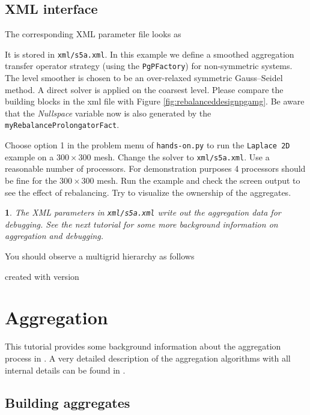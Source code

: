 \documentclass[10pt,fleqn]{book}
\newtheorem*{mycomment}{\ding{42}}
\newcommand\printScreenOutput[1]{

{\vspace{-0.3cm}\hfill\tiny{created with \muelu version }}
}
\begin{document}
\section{XML interface}
The corresponding XML parameter file looks as



It is stored in \texttt{xml/s5a.xml}. In this example we define a smoothed aggregation transfer operator strategy (using the \verb|PgPFactory|) for non-symmetric systems. The level smoother is chosen to be an over-relaxed symmetric Gauss--Seidel method. A direct solver is applied on the coarsest level. Please compare the building blocks in the xml file with Figure \ref{fig:rebalanceddesignpgamg}. Be aware that the \textit{Nullspace} variable now is also generated by the \texttt{myRebalanceProlongatorFact}.

\begin{exercise}
Choose option 1 in the problem menu of \verb|hands-on.py| to run the \verb|Laplace 2D| example on a $300\times 300$ mesh.
Change the solver to \verb|xml/s5a.xml|.
Use a reasonable number of processors. For demonstration purposes 4 processors should be fine for the $300\times 300$ mesh.
Run the example and check the screen output to see the effect of rebalancing. Try to visualize the ownership of the aggregates.
\begin{mycomment}
The XML parameters in \verb|xml/s5a.xml| write out the aggregation data for debugging. See the next tutorial for some more background information on aggregation and debugging.
\end{mycomment}
\end{exercise}

You should observe a multigrid hierarchy as follows

\printScreenOutput{s5a.txt_3.fragment_3.fragment}

\chapter{Aggregation}

This tutorial provides some background information about the aggregation process in \muelu. A very detailed description of the aggregation algorithms with all internal details can be found in \cite[Chapter 3.3]{wiesner2014}.

\section{Building aggregates}
\end{document}
